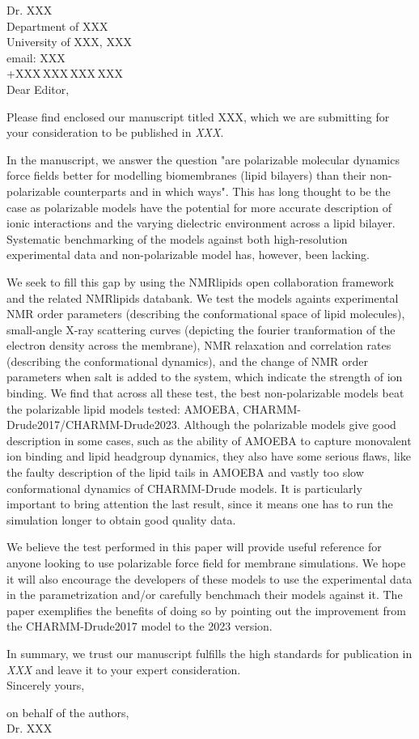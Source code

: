 \documentclass[11pt]{letter}
\begin{document}
\reversemarginpar
\pagestyle{empty}
\noindent Dr. XXX\\
\noindent Department of XXX \\
\noindent University of XXX, XXX \\
\noindent email: XXX\\
\noindent +XXX\,XXX\,XXX\,XXX \\


Dear Editor,

Please find enclosed our manuscript titled
{XXX}, which we are submitting for your consideration to be published in \textit{XXX}.

In the manuscript, we answer the question "are polarizable molecular dynamics force fields better for modelling biomembranes (lipid bilayers) than their non-polarizable counterparts and in which ways". This has long thought to be the case as polarizable models have the potential for more accurate description of ionic interactions and the varying dielectric environment across a lipid bilayer. Systematic benchmarking of the models against both high-resolution experimental data and non-polarizable model has, however, been lacking.

We seek to fill this gap by using the NMRlipids open collaboration framework and the related NMRlipids databank. We test the models againts experimental NMR order parameters (describing the conformational space of lipid molecules), small-angle X-ray scattering curves (depicting the fourier tranformation of the electron density across the membrane), NMR relaxation and correlation rates (describing the conformational dynamics), and the change of NMR order parameters when salt is added to the system, which indicate the strength of ion binding. We find that across all these test, the best non-polarizable models beat the polarizable lipid models tested: AMOEBA, CHARMM-Drude2017/CHARMM-Drude2023. Although the polarizable models give good description in some cases, such as the ability of AMOEBA to capture monovalent ion binding and lipid headgroup dynamics, they also have some serious flaws, like the faulty description of the lipid tails in AMOEBA and vastly too slow conformational dynamics of CHARMM-Drude models. It is particularly important to bring attention the last result, since it means one has to run the simulation longer to obtain good quality data.

We believe the test performed in this paper will provide useful reference for anyone looking to use polarizable force field for membrane simulations. We hope it will also encourage the developers of these models to use the experimental data in the parametrization and/or carefully benchmach their models against it. The paper exemplifies the benefits of doing so by pointing out the improvement from the CHARMM-Drude2017 model to the 2023 version.

 In summary, we trust our manuscript fulfills the high standards for publication in %
\textit{XXX} and leave it to your expert consideration.\\


Sincerely yours,

on behalf of the authors,\\

Dr. XXX
\end{document}
